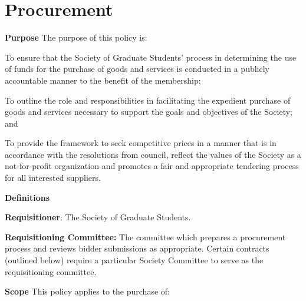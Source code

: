 \section{Procurement}
\begin{longenum}[label*=\thesection.\arabic*., align=left]
\item \textbf{Purpose} \newline
The purpose of this policy is:
\begin{longenum}[label*=\arabic*., align=left]
		 
\item To ensure that the Society of Graduate Students' process in determining the use of funds for the purchase of goods and services is conducted in a publicly accountable manner to the benefit of the membership;

\item To outline the role and responsibilities in facilitating the expedient purchase of goods and	services necessary to support the goals and objectives of the Society; and

\item To provide the framework to seek competitive prices in a manner that is in accordance with the resolutions from council, reflect the values of the Society as a not-for-profit organization and promotes a fair and	appropriate tendering process for all interested suppliers.


\end{longenum}

\item \textbf{Definitions}

\begin{longenum} [label*=\arabic*., align=left]
	
\item \textbf{Requisitioner}: The Society of Graduate Students.

\item \textbf{Requisitioning Committee:} The committee which prepares a procurement process and reviews bidder submissions as appropriate. Certain contracts (outlined below) require a particular Society Committee to serve as the requisitioning
	committee.
\end{longenum}

\item \textbf{Scope} \newline
This policy applies to the purchase of:
\begin{longenum} [label*=\arabic*., align=left]


\end{longenum}
\end{longenum}
